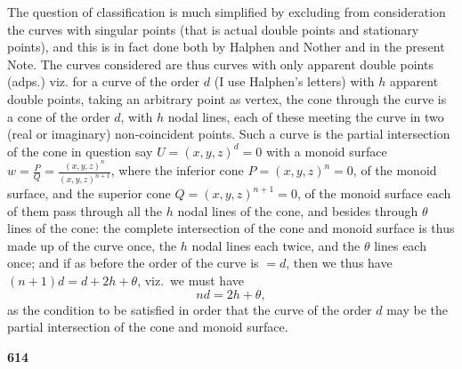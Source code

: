 \documentclass[12pt,a4paper]{article}
\theoremstyle{plain}
\begin{document}
The question of classification is much simplified by excluding from consideration the curves with singular points (that is actual double points and stationary points), and this is in fact done both by Halphen and Nother and in the present Note. The curves considered are thus curves with only apparent double points (adps.) viz. for a curve of the order $d$ (I use Halphen's letters) with $h$ apparent double points, taking an arbitrary point as vertex, the cone through the curve is a cone of the order $d$, with $h$ nodal lines, each of these meeting the curve in two (real or imaginary) non-coincident points. Such a curve is the partial intersection of the cone in question say $U=(x,y,z)^d=0$ with a monoid surface $w=\frac{P}{Q}=\frac{(x,y,z)^n}{(x,y,z)^{n+1}}$, where the inferior cone $P=(x,y,z)^n=0$, of the monoid surface, and the superior cone $Q=(x,y,z)^{n+1}=0$, of the monoid surface each of them pass through all the $h$ nodal lines of the cone, and besides through $\theta$ lines of the cone: the complete intersection of the cone and monoid surface is thus made up of the curve once, the $h$ nodal lines each twice, and the $\theta$ lines each once; and if as before the order of the curve is $=d$, then we thus have $(n+1)d = d + 2h + \theta$, viz.~we must have
\[nd = 2h + \theta,\]
as the condition to be satisfied in order that the curve of the order $d$ may be the partial intersection of the cone and monoid surface.

\newpage
\noindent\textbf{614}
\end{document}
